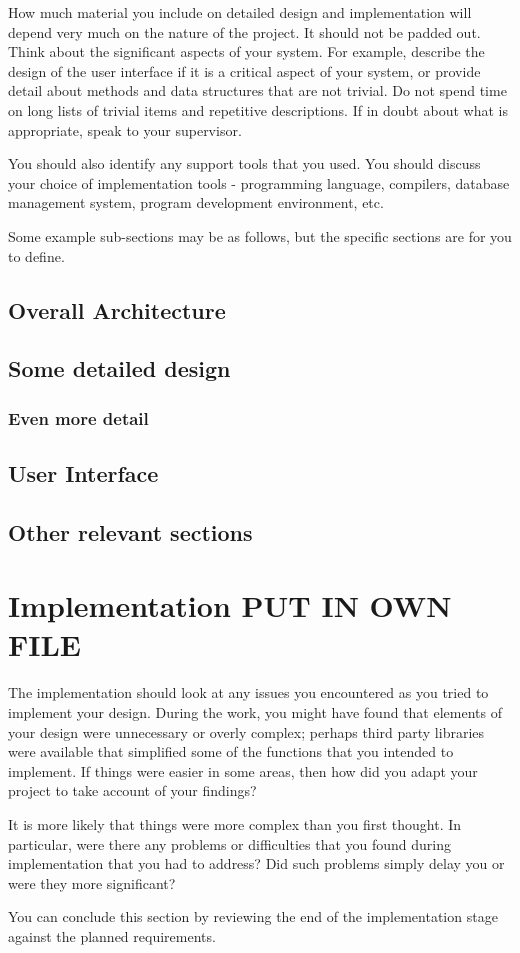 How much material you include on detailed design and implementation will depend very much on the nature of the project. It should not be padded out. Think about the significant aspects of your system. For example, describe the design of the user interface if it is a critical aspect of your system, or provide detail about methods and data structures that are not trivial. Do not spend time on long lists of trivial items and repetitive descriptions. If in doubt about what is appropriate, speak to your supervisor.
 
You should also identify any support tools that you used. You should discuss your choice of implementation tools - programming language, compilers, database management system, program development environment, etc.

Some example sub-sections may be as follows, but the specific sections are for you to define. 

\section{Overall Architecture}

\section{Some detailed design}

\subsection{Even more detail}

\section{User Interface}

\section{Other relevant sections}

\chapter{Implementation PUT IN OWN FILE}

The implementation should look at any issues you encountered as you tried to implement your design. During the work, you might have found that elements of your design were unnecessary or overly complex; perhaps third party libraries were available that simplified some of the functions that you intended to implement. If things were easier in some areas, then how did you adapt your project to take account of your findings?

It is more likely that things were more complex than you first thought. In particular, were there any problems or difficulties that you found during implementation that you had to address? Did such problems simply delay you or were they more significant? 

You can conclude this section by reviewing the end of the implementation stage against the planned requirements. 
